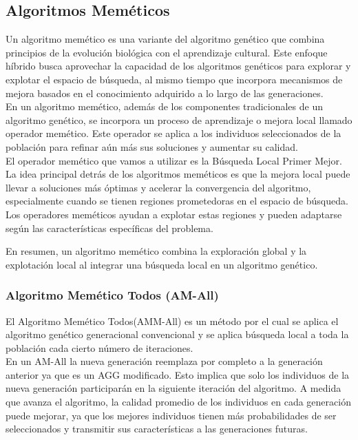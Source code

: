 \newpage

\subsection{Algoritmos Meméticos}
Un algoritmo memético es una variante del algoritmo genético que combina principios de la evolución biológica con el aprendizaje cultural. Este enfoque híbrido busca aprovechar la capacidad de los algoritmos genéticos para explorar y explotar el espacio de búsqueda, al mismo tiempo que incorpora mecanismos de mejora basados en el conocimiento adquirido a lo largo de las generaciones. \\

En un algoritmo memético, además de los componentes tradicionales de un algoritmo genético, se incorpora un proceso de aprendizaje o mejora local llamado operador memético. Este operador se aplica a los individuos seleccionados de la población para refinar aún más sus soluciones y aumentar su calidad.\\

El operador memético que vamos a utilizar es la Búsqueda Local Primer Mejor.\\

La idea principal detrás de los algoritmos meméticos es que la mejora local puede llevar a soluciones más óptimas y acelerar la convergencia del algoritmo, especialmente cuando se tienen regiones prometedoras en el espacio de búsqueda. Los operadores meméticos ayudan a explotar estas regiones y pueden adaptarse según las características específicas del problema.

En resumen, un algoritmo memético combina la exploración global y la explotación local al integrar una búsqueda local en un algoritmo genético. 

\subsubsection{Algoritmo Memético Todos (AM-All)}
El Algoritmo Memético Todos(AMM-All) es un método por el cual se aplica el algoritmo genético generacional convencional y se aplica búsqueda local a toda la población cada cierto número de iteraciones.\\

En un AM-All la nueva generación reemplaza por completo a la generación anterior ya que es un AGG modificado. Esto implica que solo los individuos de la nueva generación participarán en la siguiente iteración del algoritmo. A medida que avanza el algoritmo, la calidad promedio de los individuos en cada generación puede mejorar, ya que los mejores individuos tienen más probabilidades de ser seleccionados y transmitir sus características a las generaciones futuras.\\


